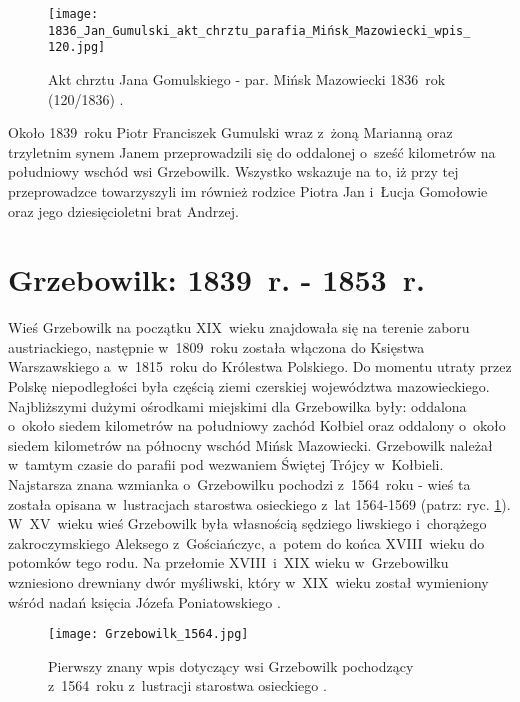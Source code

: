 \begin{figure}[!ht]
    \vspace*{0.5cm}
    \centering \texttt{[image: 
        1836\_Jan\_Gumulski\_akt\_chrztu\_parafia\_Mińsk\_Mazowiecki\_wpis\_120.jpg]}
    \captionsetup{format=hang}
    \caption{Akt chrztu Jana Gomulskiego - par. Mińsk Mazowiecki 1836~rok 
    (120/1836) \cite{par_minsk2}.}
    \label{fig:jgomulski_1836}
\end{figure}

Około 1839~roku Piotr Franciszek Gumulski wraz z~żoną Marianną oraz 
trzyletnim synem Janem przeprowadzili się do oddalonej o~sześć kilometrów na 
południowy wschód wsi Grzebowilk. Wszystko wskazuje na to, iż przy tej 
przeprowadzce towarzyszyli im również rodzice Piotra Jan i~Łucja Gomołowie 
oraz jego dziesięcioletni brat Andrzej.

\clearpage


\section{Grzebowilk: 1839~r. - 1853~r.}

Wieś Grzebowilk na początku XIX~wieku znajdowała się na terenie zaboru 
austriackiego, następnie w~1809~roku została włączona do Księstwa 
Warszawskiego a~w~1815~roku do Królestwa Polskiego. Do momentu utraty przez 
Polskę niepodległości była częścią ziemi czerskiej województwa mazowieckiego. 
Najbliższymi dużymi ośrodkami miejskimi dla Grzebowilka były: oddalona 
o~około siedem kilometrów na południowy zachód Kołbiel oraz oddalony o~około 
siedem kilometrów na północny wschód Mińsk Mazowiecki. Grzebowilk należał 
w~tamtym czasie do parafii pod wezwaniem Świętej Trójcy w~Kołbieli. 
Najstarsza znana wzmianka o~Grzebowilku pochodzi z~1564~roku - wieś ta 
została opisana w~lustracjach starostwa osieckiego z~lat 1564-1569 
\cite{agad2} (patrz: ryc. \ref{fig:jgomulski_1836}). W~XV~wieku wieś 
Grzebowilk była własnością sędziego liwskiego i~chorążego zakroczymskiego 
Aleksego z~Gościańczyc, a~potem do końca XVIII~wieku do potomków tego rodu. 
Na przełomie XVIII~i~XIX wieku w~Grzebowilku wzniesiono drewniany dwór 
myśliwski, który w~XIX~wieku został wymieniony wśród nadań księcia Józefa 
Poniatowskiego \cite{klos}.

\begin{figure}[!ht]
    \vspace*{0.5cm}
    \centering \texttt{[image: 
        Grzebowilk\_1564.jpg]}
    \captionsetup{format=hang}
    \caption{Pierwszy znany wpis dotyczący wsi Grzebowilk pochodzący 
    z~1564~roku z~lustracji starostwa osieckiego \cite{agad2}.}
    \label{fig:grzebowilk_1564}
\end{figure}

